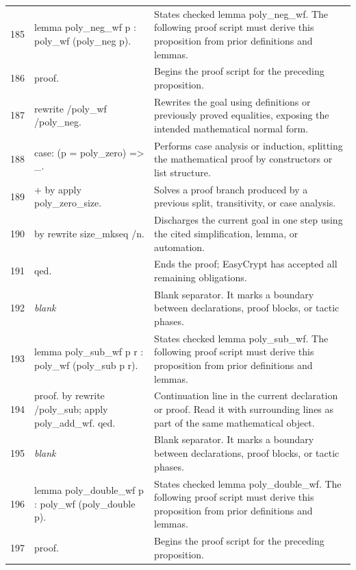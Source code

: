 \documentclass[10pt]{article}
\begin{document}
\begin{longtable}{r L{0.53\textwidth} L{0.37\textwidth}}
185 & {\ttfamily\scriptsize lemma poly\_neg\_wf p : poly\_wf (poly\_neg p).} & States checked lemma poly\_neg\_wf.  The following proof script must derive this proposition from prior definitions and lemmas. \\
186 & {\ttfamily\scriptsize proof.} & Begins the proof script for the preceding proposition. \\
187 & {\ttfamily\scriptsize rewrite /poly\_wf /poly\_neg.} & Rewrites the goal using definitions or previously proved equalities, exposing the intended mathematical normal form. \\
188 & {\ttfamily\scriptsize case: (p = poly\_zero) => \_.} & Performs case analysis or induction, splitting the mathematical proof by constructors or list structure. \\
189 & {\ttfamily\scriptsize + by apply poly\_zero\_size.} & Solves a proof branch produced by a previous split, transitivity, or case analysis. \\
190 & {\ttfamily\scriptsize by rewrite size\_mkseq /n.} & Discharges the current goal in one step using the cited simplification, lemma, or automation. \\
191 & {\ttfamily\scriptsize qed.} & Ends the proof; EasyCrypt has accepted all remaining obligations. \\
192 & {\ttfamily\scriptsize \emph{blank}} & Blank separator.  It marks a boundary between declarations, proof blocks, or tactic phases. \\
193 & {\ttfamily\scriptsize lemma poly\_sub\_wf p r : poly\_wf (poly\_sub p r).} & States checked lemma poly\_sub\_wf.  The following proof script must derive this proposition from prior definitions and lemmas. \\
194 & {\ttfamily\scriptsize proof. by rewrite /poly\_sub; apply poly\_add\_wf. qed.} & Continuation line in the current declaration or proof.  Read it with surrounding lines as part of the same mathematical object. \\
195 & {\ttfamily\scriptsize \emph{blank}} & Blank separator.  It marks a boundary between declarations, proof blocks, or tactic phases. \\
196 & {\ttfamily\scriptsize lemma poly\_double\_wf p : poly\_wf (poly\_double p).} & States checked lemma poly\_double\_wf.  The following proof script must derive this proposition from prior definitions and lemmas. \\
197 & {\ttfamily\scriptsize proof.} & Begins the proof script for the preceding proposition. \\

\end{longtable}
\end{document}
